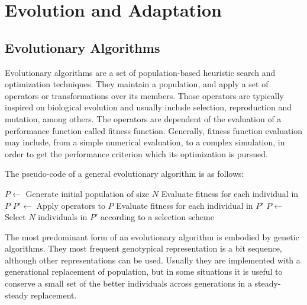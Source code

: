 \section{Evolution and Adaptation}
\subsection{Evolutionary Algorithms}
Evolutionary algorithms are a set of population-based heuristic search
and optimization techniques. They maintain a population, and apply a
set of operators or transformations over its members. Those operators
are typically inspired on biological evolution and usually include
selection, reproduction and mutation, among others. The operators are
dependent of the evaluation of a performance function called fitness
function. Generally, fitness function evaluation may include, from a
simple numerical evaluation, to a complex simulation, in order to get
the performance criterion which its optimization is pursued. 

The pseudo-code of a general evolutionary algorithm is as follows:

\begin{algorithm}[h!]
\caption{$Evolutionary Algorithm$}\label{alg:factorial}
\begin{algorithmic}[1]
\STATE $P \leftarrow$ Generate initial population of size $N$
\STATE Evaluate fitness for each individual in $P$
\REPEAT
\STATE $P' \leftarrow$ Apply operators to $P$
\STATE Evaluate fitness for each individual in $P'$
\STATE $P \leftarrow$ Select $N$ individuals in $P'$ according to a selection scheme
\end{algorithmic}
\end{algorithm}

The most predominant form of an evolutionary algorithm is embodied by
genetic algorithms. They most frequent genotypical representation is a
bit sequence, although other representations can be used. Usually they
are implemented with a generational replacement of population, but in
some situations it is useful to conserve a small set of the better
individuals across generations in a steady-steady replacement.




